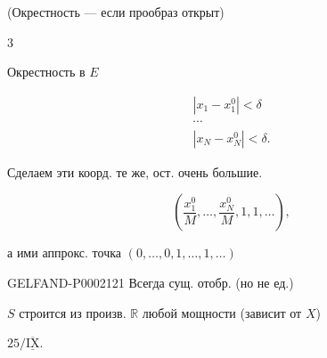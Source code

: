 (Окрестность --- если прообраз открыт)





\begin{flushright}$3$\end{flushright}



Окрестность в $E$



\begin{equation*}\begin{gathered}|x_1-x_1^0|<\delta\\\cdots\\|x_N-x_N^0|<\delta.\end{gathered}\end{equation*}



Сделаем эти коорд. те же, ост. очень большие.



\begin{equation*}\left(\frac{x_1^0}{M},\ldots,\frac{x_N^0}{M},1,1,\ldots\right),\end{equation*}



а ими аппрокс. точка $(0,\ldots,0,1,\ldots,1,\ldots)$



\begin{GelfandAdjacentEvidence}{GELFAND-P000212}{1}
Всегда сущ. отобр. (но не ед.)






\end{GelfandAdjacentEvidence}

$S$ строится из произв. $\mathbb R$ любой мощности (зависит от $X$)



$25/\overline{\underline{\mathrm{IX}}}$.



